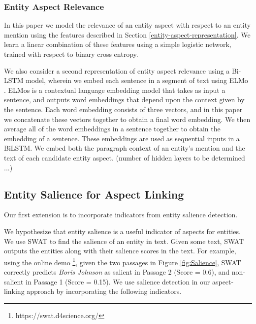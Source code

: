 \subsubsection{Entity Aspect Relevance }
In this paper we model the relevance of an entity aspect with respect to an entity mention using the features described in Section \ref{entity-aspect-representation}. We learn a linear combination of these features using a simple logistic network, trained with respect to binary cross entropy.

We also consider a second representation of entity aspect relevance using a Bi-LSTM model, wherein we embed each sentence in a segment of text using ELMo \cite{elmo}. ELMos is a contextual language embedding model that takes as input a sentence, and outputs word embeddings that depend upon the context given by the sentence. Each word embedding consists of three vectors, and in this paper we concatenate these vectors together to obtain a final word embedding. We then average all of the word embeddings in a sentence together to obtain the embedding of a sentence. These embeddings are used as sequential inputs in a BiLSTM. We embed both the paragraph context of an entity's mention and the text of each candidate entity aspect. (number of hidden layers to be determined ...)

 
\subsection{Entity Salience for Aspect Linking}
\label{subsec:Entity Salience for Aspect Linking}
Our first extension is to incorporate indicators from entity salience detection.


We hypothesize that entity salience is a useful indicator of aspects for entities. We use SWAT \cite{swat}  to find the salience of an entity in text. Given some text, SWAT outputs the entities along with their salience scores in the text. For example, using the online demo \footnote{https://swat.d4science.org/}, given the two passages in Figure \ref{fig:Salience}, SWAT correctly predicts \textit{Boris Johnson} as salient in Passage 2 (Score = 0.6), and non-salient in Passage 1 (Score = 0.15). 
We use salience detection in our aspect-linking approach by incorporating the following indicators.


